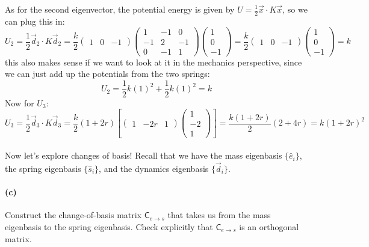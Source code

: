 \documentclass{article}
\begin{document}
\begin{solution}
	As for the second eigenvector, the potential energy is given by $U = \frac{1}{2}\vec x \cdot K \vec x$, so 
	we can plug this in:
	\[
		U_2 = \frac{1}{2}\vec d_2 \cdot K \vec d_2 = \frac{k}{2}\begin{pmatrix} 1&0&-1 \end{pmatrix} 
		\begin{pmatrix} 1 & -1 & 0 \\ -1 & 2 & -1 \\ 0 & -1 & 1 \end{pmatrix}
		\begin{pmatrix} 1 \\0\\-1 \end{pmatrix} 
		= \frac{k}{2}\begin{pmatrix} 1 & 0 & -1  \end{pmatrix} \begin{pmatrix} 1\\0\\-1 \end{pmatrix} = k
	\] 
	this also makes sense if we want to look at it in the mechanics perspective, since we can just add 
	up the potentials from the two springs: 
	\[
	U_2 = \frac{1}{2}k(1)^2 + \frac{1}{2}k(1)^2 = k
	\] 
	Now for $U_3$:
	\[
		U_3= \frac{1}{2}\vec d_3 \cdot K \vec d_3 = \frac{k}{2}(1 + 2r) \left[\begin{pmatrix} 1 & -2r & 1 \end{pmatrix} \begin{pmatrix} 1\\-2\\1 \end{pmatrix}\right] = \frac{k(1 + 2r)}{2}(2 + 4r) = k(1 + 2r)^2
	\] 
\end{solution}

\phline
\paragraph{}
Now let's explore changes of basis!  Recall that we have the mass eigenbasis $\{\hat{e}_{i}\}$, the spring eigenbasis $\{\hat{s}_{i}\}$, and the
dynamics eigenbasis $\{\vec{d}_{i}\}$.

\paragraph{(c)}
Construct the change-of-basis matrix $\mathsf{C}_{e\to s}$ that takes us from the mass eigenbasis to the spring eigenbasis.  
Check explicitly that $\mathsf{C}_{e\to s}$ is an orthogonal matrix.
\end{document}
